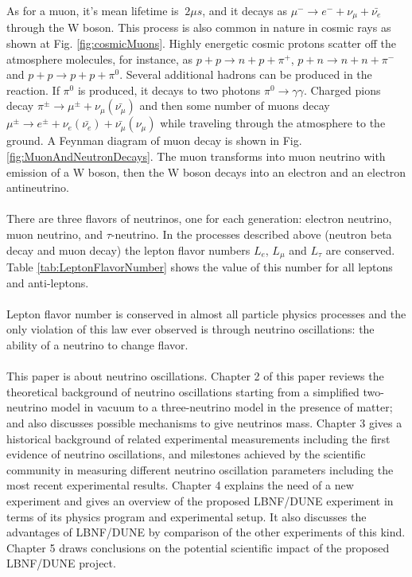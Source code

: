 As for a muon, it's mean lifetime is $~2 {\mu}s$, and it decays as ${\mu}^- \rightarrow e^- + {\nu}_{\mu} + \bar{{\nu}_e}$ through the W boson. This process is also common in nature in cosmic rays as shown at Fig. \ref{fig:cosmicMuons}. Highly energetic cosmic protons scatter off the atmosphere molecules, for instance, as $p+p \rightarrow n+p+\pi^+$, $p+n \rightarrow n+n+\pi^-$ and $p+p \rightarrow p+p+\pi^0$. Several additional hadrons can be produced in the reaction. If $\pi^0$ is produced, it decays to two photons $\pi^0 \rightarrow \gamma\gamma$. Charged pions decay $\pi^{\pm} \rightarrow \mu^{\pm} + \nu_\mu(\bar{\nu_\mu})$ and then some number of muons decay $\mu^{\pm} \rightarrow e^{\pm} + \nu_e(\bar{\nu_e}) + \bar{\nu_\mu}(\nu_\mu)$ while traveling through the atmosphere to the ground. A Feynman diagram of muon decay is shown in Fig. \ref{fig:MuonAndNeutronDecays}. The muon transforms into muon neutrino with emission of a W boson, then the W boson decays into an electron and an electron antineutrino.\\ \\
There are three flavors of neutrinos, one for each generation: electron neutrino, muon neutrino, and $\tau$-neutrino. In the processes described above (neutron beta decay and muon decay) the lepton flavor numbers $L_e$, $L_{\mu}$ and $L_{\tau}$ are conserved. Table \ref{tab:LeptonFlavorNumber} shows the value of this number for all leptons and anti-leptons. \\ \\
Lepton flavor number is conserved in almost all particle physics processes and the only violation of this law ever observed is through neutrino oscillations: the ability of a neutrino to change flavor.\\ \\
This paper is about neutrino oscillations. Chapter 2 of this paper reviews the theoretical background of neutrino oscillations starting from a simplified two-neutrino model in vacuum to a three-neutrino model in the presence of matter; and also discusses possible mechanisms to give neutrinos mass. Chapter 3 gives a historical background of related experimental measurements including the first evidence of neutrino oscillations, and milestones achieved by the scientific community in measuring different neutrino oscillation parameters including the most recent experimental results. Chapter 4 explains the need of a new experiment and gives an overview of the proposed LBNF/DUNE experiment in terms of its physics program and experimental setup. It also discusses the advantages of LBNF/DUNE by comparison of the other experiments of this kind. Chapter 5 draws conclusions on the potential scientific impact of the proposed LBNF/DUNE project.  \\ \\
